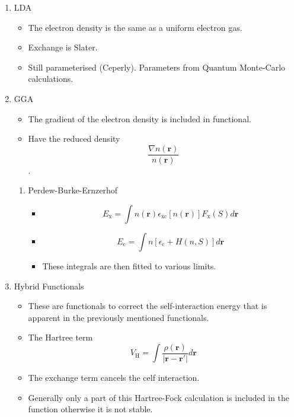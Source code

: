 \documentclass[11pt]{article}
\begin{document}
\begin{enumerate}
\item LDA
\label{sec-3-1-1-1}
\begin{itemize}
\item The electron density is the same as a uniform electron gas.
\item Exchange is Slater.
\item Still parameterised (Ceperly). Parameters from Quantum Monte-Carlo
calculations.
\end{itemize}

\item GGA
\label{sec-3-1-1-2}
\begin{itemize}
\item The gradient of the electron density is included in functional.
\item Have the reduced density \[ \frac{ \nabla n(\mathbf{r})}{n( \mathbf{r}
       )}\].
\end{itemize}
\begin{enumerate}
\item Perdew-Burke-Ernzerhof
\label{sec-3-1-1-2-1}
\begin{itemize}
\item \[ E_{\text{x}} = \int n( \mathbf{r} ) \epsilon_{\text{xc}}[n( \mathbf{r}
        )] F_{\text{x}}(S)d\mathbf{r} \]
\item \[ E_{\text{c}} = \int n[ \epsilon_{\text{c}} + H(n,S) ]d\mathbf{r} \]
\item These integrals are then fitted to various limits.
\end{itemize}
\end{enumerate}

\item Hybrid Functionals
\label{sec-3-1-1-3}
\begin{itemize}
\item These are functionals to correct the self-interaction energy that is
apparent in the previously mentioned functionals.
\item The Hartree term \[V_{\text{H}}=\int \frac{\rho(\mathbf{r})}{|\mathbf{r} - \mathbf{r}'|} d\mathbf{r}  \]
\item The exchange term cancels the celf interaction.
\item Generally only a part of this Hartree-Fock calculation is included in
the function otherwise it is not stable.
\end{itemize}






\end{enumerate}
\end{document}
